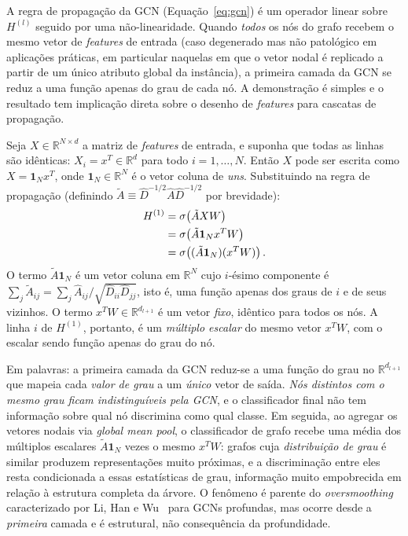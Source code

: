 A regra de propaga\c{c}\~ao da GCN (Equa\c{c}\~ao~\ref{eq:gcn}) \'e
um operador linear sobre $H^{(l)}$ seguido por uma n\~ao-linearidade.
Quando \emph{todos} os n\'os do grafo recebem o mesmo vetor de
\emph{features} de entrada (caso degenerado mas n\~ao patol\'ogico
em aplica\c{c}\~oes pr\'aticas, em particular naquelas em que o vetor
nodal \'e replicado a partir de um \'unico atributo global da
inst\^ancia), a primeira camada da GCN se reduz a uma fun\c{c}\~ao
apenas do grau de cada n\'o. A demonstra\c{c}\~ao \'e simples e o
resultado tem implica\c{c}\~ao direta sobre o desenho de
\emph{features} para cascatas de propaga\c{c}\~ao.

Seja $X \in \mathbb{R}^{N \times d}$ a matriz de \emph{features} de
entrada, e suponha que todas as linhas s\~ao id\^enticas:
$X_i = x^{T} \in \mathbb{R}^{d}$ para todo $i = 1, \ldots, N$. Ent\~ao
$X$ pode ser escrita como $X = \mathbf{1}_N x^{T}$, onde
$\mathbf{1}_N \in \mathbb{R}^N$ \'e o vetor coluna de \emph{uns}.
Substituindo na regra de propaga\c{c}\~ao (definindo
$\tilde{A} \equiv \hat{D}^{-1/2} \hat{A} \hat{D}^{-1/2}$ por brevidade):
\begin{align}
H^{(1)} &= \sigma\!\left( \tilde{A} X W \right) \notag \\
        &= \sigma\!\left( \tilde{A} \mathbf{1}_N x^{T} W \right) \notag \\
        &= \sigma\!\left( (\tilde{A} \mathbf{1}_N)(x^{T} W) \right).
\label{eq:degeneracao}
\end{align}
O termo $\tilde{A} \mathbf{1}_N$ \'e um vetor coluna em
$\mathbb{R}^{N}$ cujo $i$-\'esimo componente \'e
$\sum_j \tilde{A}_{ij} = \sum_j \hat{A}_{ij} / \sqrt{\hat{D}_{ii} \hat{D}_{jj}}$,
isto \'e, uma fun\c{c}\~ao apenas dos graus de $i$ e de seus vizinhos.
O termo $x^{T} W \in \mathbb{R}^{d_{l+1}}$ \'e um vetor \emph{fixo},
id\^entico para todos os n\'os. A linha $i$ de $H^{(1)}$, portanto, \'e
um \emph{m\'ultiplo escalar} do mesmo vetor $x^{T} W$, com o escalar
sendo fun\c{c}\~ao apenas do grau do n\'o.

Em palavras: a primeira camada da GCN reduz-se a uma fun\c{c}\~ao do
grau no $\mathbb{R}^{d_{l+1}}$ que mapeia cada \emph{valor de grau} a
um \emph{\'unico} vetor de sa\'ida. \emph{N\'os distintos com o mesmo
grau ficam indistingu\'iveis pela GCN}, e o classificador final n\~ao
tem informa\c{c}\~ao sobre qual n\'o discrimina como qual classe. Em
seguida, ao agregar os vetores nodais via \emph{global mean pool}, o
classificador de grafo recebe uma m\'edia dos m\'ultiplos escalares
$\tilde{A}\mathbf{1}_N$ vezes o mesmo $x^{T} W$: grafos cuja
\emph{distribui\c{c}\~ao de grau} \'e similar produzem
representa\c{c}\~oes muito pr\'oximas, e a discrimina\c{c}\~ao entre
eles resta condicionada a essas estat\'isticas de grau,
informa\c{c}\~ao muito empobrecida em rela\c{c}\~ao \`a estrutura
completa da \'arvore. O fen\^omeno \'e parente do \emph{oversmoothing}
caracterizado por Li, Han e Wu~\cite{li2018deeper} para GCNs
profundas, mas ocorre desde a \emph{primeira} camada e \'e estrutural,
n\~ao consequ\^encia da profundidade.

